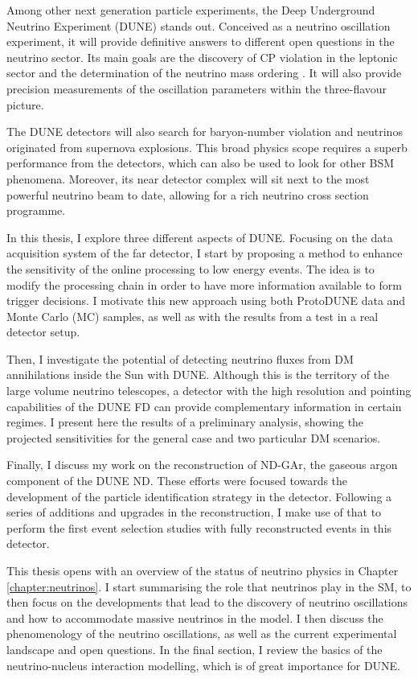 Among other next generation particle experiments, the Deep Underground Neutrino Experiment (DUNE) stands out. Conceived as a neutrino oscillation experiment, it will provide definitive answers to different open questions in the neutrino sector. Its main goals are the discovery of CP violation in the leptonic sector and the determination of the neutrino mass ordering \cite{DUNE2020TDR1}. It will also provide precision measurements of the oscillation parameters within the three-flavour picture.

The DUNE detectors will also search for baryon-number violation and neutrinos originated from supernova explosions. This broad physics scope requires a superb performance from the detectors, which can also be used to look for other BSM phenomena. Moreover, its near detector complex will sit next to the most powerful neutrino beam to date, allowing for a rich neutrino cross section programme.

In this thesis, I explore three different aspects of DUNE. Focusing on the data acquisition system of the far detector, I start by proposing a method to enhance the sensitivity of the online processing to low energy events. The idea is to modify the processing chain in order to have more information available to form trigger decisions. I motivate this new approach using both ProtoDUNE data and Monte Carlo (MC) samples, as well as with the results from a test in a real detector setup.

Then, I investigate the potential of detecting neutrino fluxes from DM annihilations inside the Sun with DUNE. Although this is the territory of the large volume neutrino telescopes, a detector with the high resolution and pointing capabilities of the DUNE FD can provide complementary information in certain regimes. I present here the results of a preliminary analysis, showing the projected sensitivities for the general case and two particular DM scenarios.

Finally, I discuss my work on the reconstruction of ND-GAr, the gaseous argon component of the DUNE ND. These efforts were focused towards the development of the particle identification strategy in the detector. Following a series of additions and upgrades in the reconstruction, I make use of that to perform the first event selection studies with fully reconstructed events in this detector.

This thesis opens with an overview of the status of neutrino physics in Chapter \ref{chapter:neutrinos}. I start summarising the role that neutrinos play in the SM, to then focus on the developments that lead to the discovery of neutrino oscillations and how to accommodate massive neutrinos in the model. I then discuss the phenomenology of the neutrino oscillations, as well as the current experimental landscape and open questions. In the final section, I review the basics of the neutrino-nucleus interaction modelling, which is of great importance for DUNE.


